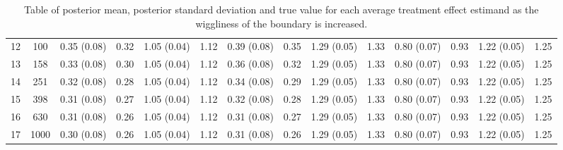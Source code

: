 \documentclass[letter]{article}
\begin{document}
\begin{landscape}
\begin{table}
\begin{tabular}{r|ccccccccccccc}
		12 & 100 & 0.35 (0.08) & 0.32 & 1.05 (0.04) & 1.12 & 0.39 (0.08) & 0.35 & 1.29 (0.05) & 1.33 & 0.80 (0.07) & 0.93 & 1.22 (0.05) & 1.25 \\
		13 & 158 & 0.33 (0.08) & 0.30 & 1.05 (0.04) & 1.12 & 0.36 (0.08) & 0.32 & 1.29 (0.05) & 1.33 & 0.80 (0.07) & 0.93 & 1.22 (0.05) & 1.25 \\
		14 & 251 & 0.32 (0.08) & 0.28 & 1.05 (0.04) & 1.12 & 0.34 (0.08) & 0.29 & 1.29 (0.05) & 1.33 & 0.80 (0.07) & 0.93 & 1.22 (0.05) & 1.25 \\
		15 & 398 & 0.31 (0.08) & 0.27 & 1.05 (0.04) & 1.12 & 0.32 (0.08) & 0.28 & 1.29 (0.05) & 1.33 & 0.80 (0.07) & 0.93 & 1.22 (0.05) & 1.25 \\
		16 & 630 & 0.31 (0.08) & 0.26 & 1.05 (0.04) & 1.12 & 0.31 (0.08) & 0.27 & 1.29 (0.05) & 1.33 & 0.80 (0.07) & 0.93 & 1.22 (0.05) & 1.25 \\
		17 & 1000 & 0.30 (0.08) & 0.26 & 1.05 (0.04) & 1.12 & 0.31 (0.08) & 0.26 & 1.29 (0.05) & 1.33 & 0.80 (0.07) & 0.93 & 1.22 (0.05) & 1.25 \\
	\end{tabular}
	\caption{Table of posterior mean, posterior standard deviation and true value for each average treatment effect estimand as the wiggliness of the boundary is increased.}
\end{table}
\end{landscape}
\restoregeometry

    
    
	
	

    
    
\end{document}
